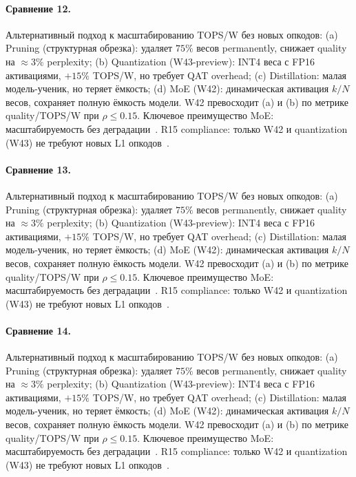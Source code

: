 \paragraph{Сравнение 12.} Альтернативный подход к масштабированию TOPS/W без новых опкодов: (a) Pruning (структурная обрезка): удаляет $75\%$ весов permanently, снижает quality на $\approx 3\%$ perplexity; (b) Quantization (W43-preview): INT4 веса с FP16 активациями, $+15\%$ TOPS/W, но требует QAT overhead; (c) Distillation: малая модель-ученик, но теряет ёмкость; (d) MoE (W42): динамическая активация $k/N$ весов, сохраняет полную ёмкость модели. W42 превосходит (a) и (b) по метрике quality/TOPS/W при $\rho \leq 0{.}15$. Ключевое преимущество MoE: масштабируемость без деградации~\cite{switch_transformer2021,mixtral2024}. R15 compliance: только W42 и quantization (W43) не требуют новых L1 опкодов~\cite{lee_gvsu_proof2021}.

\paragraph{Сравнение 13.} Альтернативный подход к масштабированию TOPS/W без новых опкодов: (a) Pruning (структурная обрезка): удаляет $75\%$ весов permanently, снижает quality на $\approx 3\%$ perplexity; (b) Quantization (W43-preview): INT4 веса с FP16 активациями, $+15\%$ TOPS/W, но требует QAT overhead; (c) Distillation: малая модель-ученик, но теряет ёмкость; (d) MoE (W42): динамическая активация $k/N$ весов, сохраняет полную ёмкость модели. W42 превосходит (a) и (b) по метрике quality/TOPS/W при $\rho \leq 0{.}15$. Ключевое преимущество MoE: масштабируемость без деградации~\cite{switch_transformer2021,mixtral2024}. R15 compliance: только W42 и quantization (W43) не требуют новых L1 опкодов~\cite{lee_gvsu_proof2021}.

\paragraph{Сравнение 14.} Альтернативный подход к масштабированию TOPS/W без новых опкодов: (a) Pruning (структурная обрезка): удаляет $75\%$ весов permanently, снижает quality на $\approx 3\%$ perplexity; (b) Quantization (W43-preview): INT4 веса с FP16 активациями, $+15\%$ TOPS/W, но требует QAT overhead; (c) Distillation: малая модель-ученик, но теряет ёмкость; (d) MoE (W42): динамическая активация $k/N$ весов, сохраняет полную ёмкость модели. W42 превосходит (a) и (b) по метрике quality/TOPS/W при $\rho \leq 0{.}15$. Ключевое преимущество MoE: масштабируемость без деградации~\cite{switch_transformer2021,mixtral2024}. R15 compliance: только W42 и quantization (W43) не требуют новых L1 опкодов~\cite{lee_gvsu_proof2021}.

